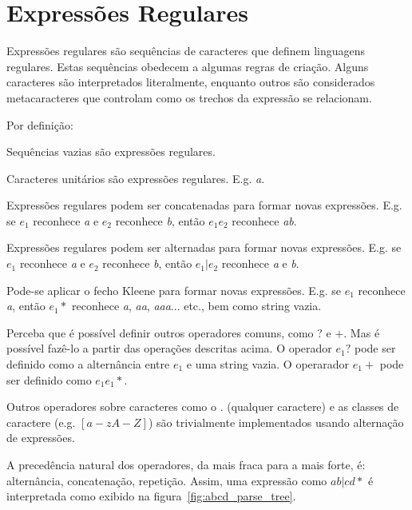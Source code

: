 \documentclass[a4paper,12pt,oneside,onecolumn]{uerj}
\begin{document}
\section{Expressões Regulares}

Expressões regulares são sequências de caracteres que definem linguagens regulares. Estas sequências obedecem a algumas regras de criação. Alguns caracteres são interpretados literalmente, enquanto outros são considerados metacaracteres que controlam como os trechos da expressão se relacionam.

Por definição:

\begin{lcircp}
    \item Sequências vazias são expressões regulares.
    \item Caracteres unitários são expressões regulares. E.g. \emph{a}.
    \item Expressões regulares podem ser concatenadas para formar novas expressões. E.g. se $e_1$ reconhece \emph{a} e $e_2$ reconhece \emph{b}, então $e_1e_2$ reconhece \emph{ab}.
    \item Expressões regulares podem ser alternadas para formar novas expressões. E.g. se $e_1$ reconhece \emph{a} e $e_2$ reconhece \emph{b}, então $e_1|e_2$ reconhece \emph{a} e \emph{b}.
    \item Pode-se aplicar o fecho Kleene para formar novas expressões. E.g. se $e_1$ reconhece \emph{a}, então $e_1*$ reconhece \emph{a}, \emph{aa}, \emph{aaa}... etc., bem como string vazia.
\end{lcircp}

Perceba que é possível definir outros operadores comuns, como $?$ e $+$. Mas é possível fazê-lo a partir das operações descritas acima. O operador $e_1?$ pode ser definido como a alternância entre $e_1$ e uma string vazia. O operarador $e_1+$ pode ser definido como $e_1e_1*$.

Outros operadores sobre caracteres como o $.$ (qualquer caractere) e as classes de caractere (e.g. $[a-zA-Z]$) são trivialmente implementados usando alternação de expressões.

A precedência natural dos operadores, da mais fraca para a mais forte, é: alternância, concatenação, repetição. Assim, uma expressão como $ab|cd*$ é interpretada como exibido na figura~\ref{fig:abcd_parse_tree}.
\end{document}
